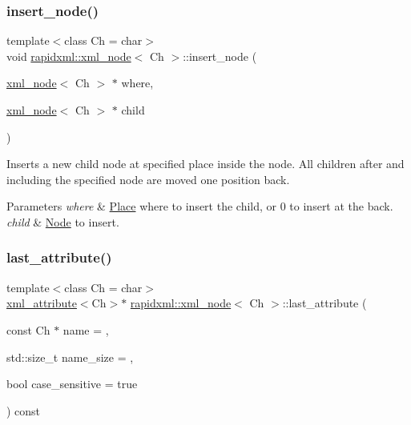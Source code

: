 \subsubsection{\texorpdfstring{insert\+\_\+node()}{insert\_node()}}
{\footnotesize\ttfamily template$<$class Ch = char$>$ \\
void \hyperlink{classrapidxml_1_1xml__node}{rapidxml\+::xml\+\_\+node}$<$ Ch $>$\+::insert\+\_\+node (\begin{DoxyParamCaption}\item[{\hyperlink{classrapidxml_1_1xml__node}{xml\+\_\+node}$<$ Ch $>$ $\ast$}]{where,  }\item[{\hyperlink{classrapidxml_1_1xml__node}{xml\+\_\+node}$<$ Ch $>$ $\ast$}]{child }\end{DoxyParamCaption})\hspace{0.3cm}{\ttfamily [inline]}}

Inserts a new child node at specified place inside the node. All children after and including the specified node are moved one position back. 
\begin{DoxyParams}{Parameters}
{\em where} & \hyperlink{classPlace}{Place} where to insert the child, or 0 to insert at the back. \\
\hline
{\em child} & \hyperlink{classNode}{Node} to insert. \\
\hline
\end{DoxyParams}
\mbox{\label{classrapidxml_1_1xml__node_a67db03d1568dc6891573210ddba61520}} 
\subsubsection{\texorpdfstring{last\+\_\+attribute()}{last\_attribute()}}
{\footnotesize\ttfamily template$<$class Ch = char$>$ \\
\hyperlink{classrapidxml_1_1xml__attribute}{xml\+\_\+attribute}$<$Ch$>$$\ast$ \hyperlink{classrapidxml_1_1xml__node}{rapidxml\+::xml\+\_\+node}$<$ Ch $>$\+::last\+\_\+attribute (\begin{DoxyParamCaption}\item[{const Ch $\ast$}]{name = {},  }\item[{std\+::size\+\_\+t}]{name\+\_\+size = {},  }\item[{bool}]{case\+\_\+sensitive = {\ttfamily true} }\end{DoxyParamCaption}) const\hspace{0.3cm}{\ttfamily [inline]}}

